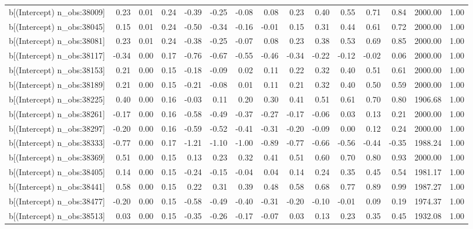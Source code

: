 \begin{table}[ht]
\begin{tabular}{rrrrrrrrrrrrrrr}
  b[(Intercept) n\_obs:38009] & 0.23 & 0.01 & 0.24 & -0.39 & -0.25 & -0.08 & 0.08 & 0.23 & 0.40 & 0.55 & 0.71 & 0.84 & 2000.00 & 1.00 \\ 
  b[(Intercept) n\_obs:38045] & 0.15 & 0.01 & 0.24 & -0.50 & -0.34 & -0.16 & -0.01 & 0.15 & 0.31 & 0.44 & 0.61 & 0.72 & 2000.00 & 1.00 \\ 
  b[(Intercept) n\_obs:38081] & 0.23 & 0.01 & 0.24 & -0.38 & -0.25 & -0.07 & 0.08 & 0.23 & 0.38 & 0.53 & 0.69 & 0.85 & 2000.00 & 1.00 \\ 
  b[(Intercept) n\_obs:38117] & -0.34 & 0.00 & 0.17 & -0.76 & -0.67 & -0.55 & -0.46 & -0.34 & -0.22 & -0.12 & -0.02 & 0.06 & 2000.00 & 1.00 \\ 
  b[(Intercept) n\_obs:38153] & 0.21 & 0.00 & 0.15 & -0.18 & -0.09 & 0.02 & 0.11 & 0.22 & 0.32 & 0.40 & 0.51 & 0.61 & 2000.00 & 1.00 \\ 
  b[(Intercept) n\_obs:38189] & 0.21 & 0.00 & 0.15 & -0.21 & -0.08 & 0.01 & 0.11 & 0.21 & 0.32 & 0.40 & 0.50 & 0.59 & 2000.00 & 1.00 \\ 
  b[(Intercept) n\_obs:38225] & 0.40 & 0.00 & 0.16 & -0.03 & 0.11 & 0.20 & 0.30 & 0.41 & 0.51 & 0.61 & 0.70 & 0.80 & 1906.68 & 1.00 \\ 
  b[(Intercept) n\_obs:38261] & -0.17 & 0.00 & 0.16 & -0.58 & -0.49 & -0.37 & -0.27 & -0.17 & -0.06 & 0.03 & 0.13 & 0.21 & 2000.00 & 1.00 \\ 
  b[(Intercept) n\_obs:38297] & -0.20 & 0.00 & 0.16 & -0.59 & -0.52 & -0.41 & -0.31 & -0.20 & -0.09 & 0.00 & 0.12 & 0.24 & 2000.00 & 1.00 \\ 
  b[(Intercept) n\_obs:38333] & -0.77 & 0.00 & 0.17 & -1.21 & -1.10 & -1.00 & -0.89 & -0.77 & -0.66 & -0.56 & -0.44 & -0.35 & 1988.24 & 1.00 \\ 
  b[(Intercept) n\_obs:38369] & 0.51 & 0.00 & 0.15 & 0.13 & 0.23 & 0.32 & 0.41 & 0.51 & 0.60 & 0.70 & 0.80 & 0.93 & 2000.00 & 1.00 \\ 
  b[(Intercept) n\_obs:38405] & 0.14 & 0.00 & 0.15 & -0.24 & -0.15 & -0.04 & 0.04 & 0.14 & 0.24 & 0.35 & 0.45 & 0.54 & 1981.17 & 1.00 \\ 
  b[(Intercept) n\_obs:38441] & 0.58 & 0.00 & 0.15 & 0.22 & 0.31 & 0.39 & 0.48 & 0.58 & 0.68 & 0.77 & 0.89 & 0.99 & 1987.27 & 1.00 \\ 
  b[(Intercept) n\_obs:38477] & -0.20 & 0.00 & 0.15 & -0.58 & -0.49 & -0.40 & -0.31 & -0.20 & -0.10 & -0.01 & 0.09 & 0.19 & 1974.37 & 1.00 \\ 
  b[(Intercept) n\_obs:38513] & 0.03 & 0.00 & 0.15 & -0.35 & -0.26 & -0.17 & -0.07 & 0.03 & 0.13 & 0.23 & 0.35 & 0.45 & 1932.08 & 1.00 \\ 

\end{tabular}
\end{table}
